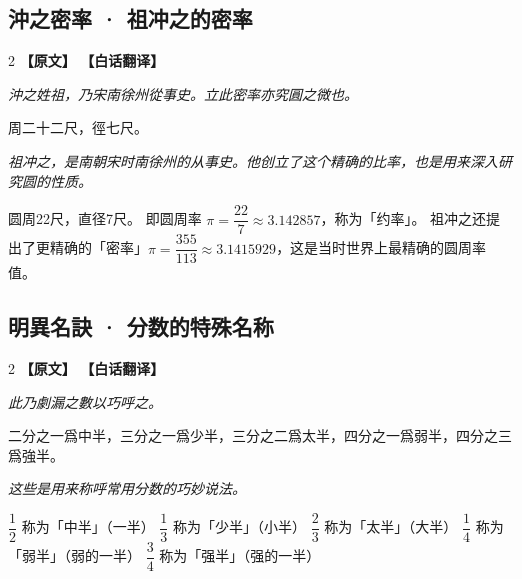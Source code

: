\documentclass[11pt,a4paper]{article}
\begin{document}
\subsection{沖之密率 · 祖冲之的密率}

\begin{paracol}{2}
\noindent\textbf{\textcolor{leftlabel}{【原文】}}
\switchcolumn
\noindent\textbf{\textcolor{rightlabel}{【白话翻译】}}
\switchcolumn*

\textit{沖之姓祖，乃宋南徐州從事史。立此密率亦究圓之微也。}

\medskip

周二十二尺，徑七尺。

\switchcolumn

\textit{祖冲之，是南朝宋时南徐州的从事史。他创立了这个精确的比率，也是用来深入研究圆的性质。}

\medskip

圆周22尺，直径7尺。\break
即圆周率 $\pi = \dfrac{22}{7} \approx 3.142857$，称为「约率」。\break
祖冲之还提出了更精确的「密率」$\pi = \dfrac{355}{113} \approx 3.1415929$，这是当时世界上最精确的圆周率值。

\end{paracol}

\medskip

\subsection{明異名訣 · 分数的特殊名称}

\begin{paracol}{2}
\noindent\textbf{\textcolor{leftlabel}{【原文】}}
\switchcolumn
\noindent\textbf{\textcolor{rightlabel}{【白话翻译】}}
\switchcolumn*

\textit{此乃劇漏之數以巧呼之。}

\medskip

二分之一爲中半，三分之一爲少半，三分之二爲太半，四分之一爲弱半，四分之三爲強半。

\switchcolumn

\textit{这些是用来称呼常用分数的巧妙说法。}

\medskip

$\dfrac{1}{2}$ 称为「中半」（一半）\quad
$\dfrac{1}{3}$ 称为「少半」（小半）\quad
$\dfrac{2}{3}$ 称为「太半」（大半）\quad
$\dfrac{1}{4}$ 称为「弱半」（弱的一半）\quad
$\dfrac{3}{4}$ 称为「强半」（强的一半）

\end{paracol}
\end{document}
